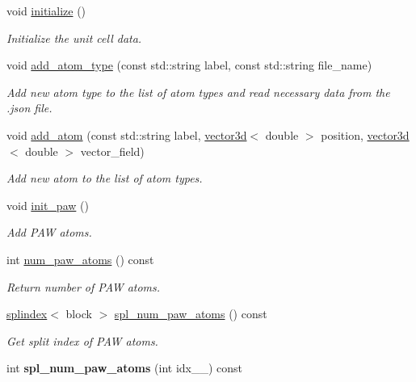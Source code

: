 \begin{DoxyCompactItemize}
\item 
void \hyperlink{classsirius_1_1_unit__cell_a3ade5edcc57d81eb8036157f68112a56}{initialize} ()
\begin{DoxyCompactList}\small\item\em Initialize the unit cell data. \end{DoxyCompactList}\item 
void \hyperlink{classsirius_1_1_unit__cell_a7072576dc55a0c768a4aa1e6bbbbf0a5}{add\+\_\+atom\+\_\+type} (const std\+::string label, const std\+::string file\+\_\+name)
\begin{DoxyCompactList}\small\item\em Add new atom type to the list of atom types and read necessary data from the .json file. \end{DoxyCompactList}\item 
void \hyperlink{classsirius_1_1_unit__cell_a6370b1dd71c63be44228efabaf0d0293}{add\+\_\+atom} (const std\+::string label, \hyperlink{classgeometry3d_1_1vector3d}{vector3d}$<$ double $>$ position, \hyperlink{classgeometry3d_1_1vector3d}{vector3d}$<$ double $>$ vector\+\_\+field)
\begin{DoxyCompactList}\small\item\em Add new atom to the list of atom types. \end{DoxyCompactList}\item 
void \hyperlink{classsirius_1_1_unit__cell_a3c6cdebd28fa00730179967a74254c25}{init\+\_\+paw} ()
\begin{DoxyCompactList}\small\item\em Add P\+A\+W atoms. \end{DoxyCompactList}\item 
int \hyperlink{classsirius_1_1_unit__cell_a06a98ddd98edfe770be18172a76a9c3f}{num\+\_\+paw\+\_\+atoms} () const 
\begin{DoxyCompactList}\small\item\em Return number of P\+A\+W atoms. \end{DoxyCompactList}\item 
\hyperlink{classsddk_1_1splindex}{splindex}$<$ block $>$ \hyperlink{classsirius_1_1_unit__cell_a22bb0e85d29350c1238e4ea05cd11a06}{spl\+\_\+num\+\_\+paw\+\_\+atoms} () const 
\begin{DoxyCompactList}\small\item\em Get split index of P\+A\+W atoms. \end{DoxyCompactList}\item 
\hypertarget{classsirius_1_1_unit__cell_a6c912a364af893f74a82f4f90c87644e}{}int {\bfseries spl\+\_\+num\+\_\+paw\+\_\+atoms} (int idx\+\_\+\+\_\+) const \label{classsirius_1_1_unit__cell_a6c912a364af893f74a82f4f90c87644e}


\end{DoxyCompactItemize}
